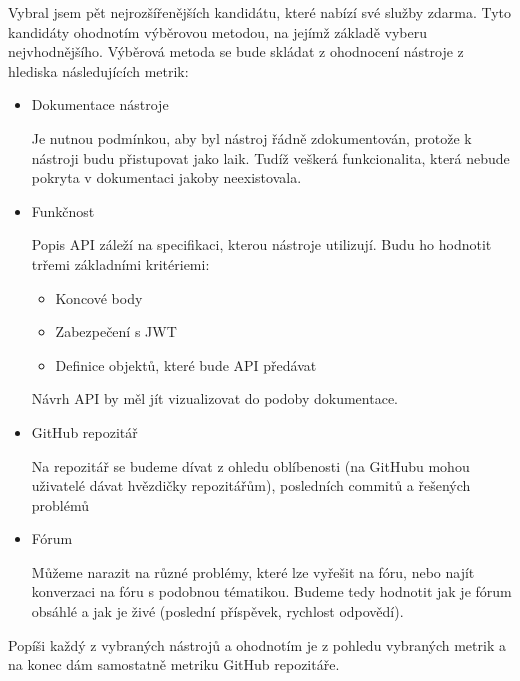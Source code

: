 \documentclass[thesis=B,czech]{FITthesis}[2012/06/26]
\begin{document}
        Vybral jsem pět nejrozšířenějších kandidátu, které nabízí své služby zdarma. Tyto kandidáty 
        ohodnotím výběrovou metodou, na jejímž základě vyberu nejvhodnějšího. Výběrová metoda se bude skládat z ohodnocení nástroje z hlediska následujících metrik:
        \begin{itemize}
            \item Dokumentace nástroje
            
            	Je nutnou podmínkou, aby byl nástroj řádně zdokumentován, protože k nástroji budu přistupovat jako laik. Tudíž veškerá funkcionalita, která nebude pokryta v dokumentaci jakoby neexistovala.
            \item Funkčnost
           	
               	Popis API záleží na specifikaci, kterou nástroje utilizují. Budu ho hodnotit trřemi základními kritériemi:
       	        \begin{itemize}
               	    \item Koncové body
    		        \item Zabezpečení s JWT
    		        \item Definice objektů, které bude API předávat
        		\end{itemize}
    	        Návrh API by měl jít vizualizovat do podoby dokumentace. 
            \item GitHub repozitář
            
                Na repozitář se budeme dívat z ohledu oblíbenosti (na GitHubu mohou uživatelé dávat hvězdičky repozitářům), posledních commitů a řešených problémů
            \item Fórum
            
                Můžeme narazit na různé problémy, které lze vyřešit na fóru, nebo najít konverzaci na fóru s podobnou tématikou. Budeme tedy hodnotit jak je fórum obsáhlé a jak je živé (poslední příspěvek, rychlost odpovědí).
        \end{itemize}
        Popíši každý z vybraných nástrojů a ohodnotím je z pohledu vybraných metrik a na konec dám samostatně metriku GitHub repozitáře.
\end{document}
